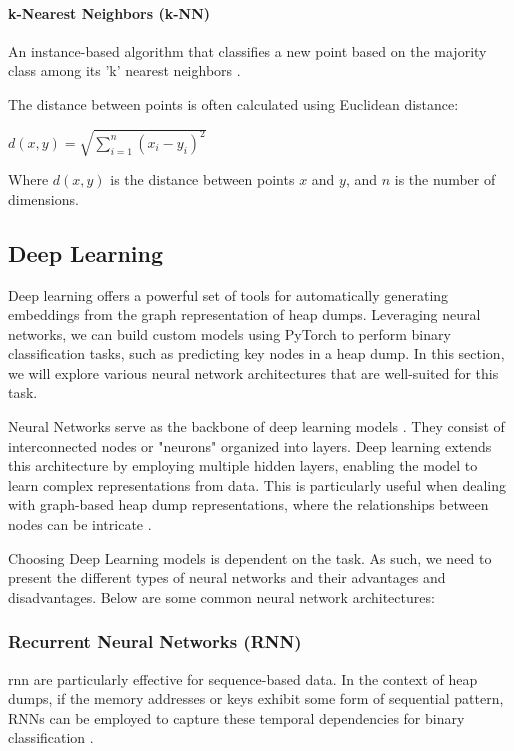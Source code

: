         \paragraph{k-Nearest Neighbors (k-NN)}
        An instance-based algorithm that classifies a new point based on the majority class among its 'k' nearest neighbors \cite{laaksonen_classification_1996}.

    \begin{minipage}{\dimexpr\linewidth-20pt}
        The distance between points is often calculated using Euclidean distance:
        \par
        \vspace{2em}
        \begin{center}
            $
            d(x, y) = \sqrt{\sum_{i=1}^{n} (x_i - y_i)^2}
            $
        \end{center}
        \vspace{1em}
        Where \( d(x, y) \) is the distance between points \( x \) and \( y \), and \( n \) is the number of dimensions.
    \end{minipage}

    \subsection{Deep Learning}
    Deep learning offers a powerful set of tools for automatically generating embeddings from the graph representation of heap dumps. Leveraging neural networks, we can build custom models using PyTorch to perform binary classification tasks, such as predicting key nodes in a heap dump. In this section, we will explore various neural network architectures that are well-suited for this task.

    Neural Networks serve as the backbone of deep learning models \cite{DeepLearningBook16}. They consist of interconnected nodes or "neurons" organized into layers. Deep learning extends this architecture by employing multiple hidden layers, enabling the model to learn complex representations from data. This is particularly useful when dealing with graph-based heap dump representations, where the relationships between nodes can be intricate \cite{KG22}. 
    
    Choosing Deep Learning models is dependent on the task. As such, we need to present the different types of neural networks and their advantages and disadvantages. Below are some common neural network architectures:

    \subsubsection{Recurrent Neural Networks (RNN)}
    \acrfull{rnn} are particularly effective for sequence-based data. In the context of heap dumps, if the memory addresses or keys exhibit some form of sequential pattern, RNNs can be employed to capture these temporal dependencies for binary classification \cite[10.2]{DeepLearningBook16}.

